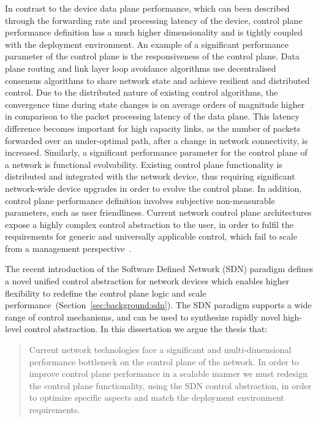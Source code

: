 In contrast to the device data plane performance, which can been described
through the forwarding rate and processing latency of the device, control plane
performance definition has a much higher dimensionality and is tightly coupled
with the deployment environment. An example of a significant performance
parameter of the control plane is the responsiveness of the control plane. Data
plane routing and link layer loop avoidance algorithms use decentralised
consensus algorithms to share network state and achieve resilient and
distributed control.  Due to the distributed nature of existing control
algorithms, the convergence time during state changes is on average orders of
magnitude higher in comparison to the packet processing latency of the data
plane. This latency difference becomes important for high capacity links, as the
number of packets forwarded over an under-optimal path, after a change in
network connectivity, is increased.  Similarly, a significant performance
parameter for the control plane of a network is functional evolvability.
Existing control plane functionality is distributed and integrated with the
network device, thus requiring significant network-wide device upgrades in order
to evolve the control plane.  In addition, control plane performance definition
involves subjective non-measurable parameters, such as user friendliness.
Current network control plane architectures expose a highly complex control
abstraction to the user, in order to fulfil the requirements for generic and
universally applicable control, which fail to scale from a management
perspective~\cite{Mahajan02}.

The recent introduction of the Software Defined Network (SDN) paradigm defines a
novel unified control abstraction for network devices which enables higher
flexibility to redefine the control plane logic and scale
performance~(Section~\ref{sec:background:sdn}).  The SDN paradigm supports a
wide range of control mechanisms, and can be used to synthesize rapidly novel
high-level control abstraction.  In this dissertation we argue the thesis that: 

\begin{quotation} Current network technologies face a significant and
  multi-dimensional performance bottleneck on the control plane of the network.
  In order to improve control plane performance in a scalable manner we must
  redesign the control plane functionality, using the SDN control abstraction,
  in order to optimize specific aspects and match the deployment environment
  requirements.  \end{quotation}

